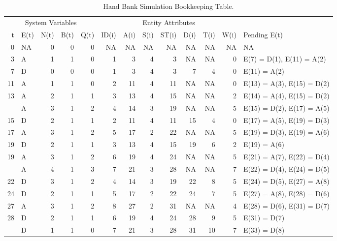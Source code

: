 \documentclass[
]{book}
\theoremstyle{definition}
\theoremstyle{definition}
\theoremstyle{definition}
\theoremstyle{definition}
\theoremstyle{remark}
\begin{document}
\begin{table}

\caption{\label{tab:SQBHFull}Hand Bank Simulation Bookkeeping Table.}
\centering
\fontsize{10}{12}\selectfont
\begin{tabular}[t]{rlrrrrrrrrrrl}
\toprule
\multicolumn{5}{c}{System Variables} & \multicolumn{7}{c}{Entity Attributes} & \multicolumn{1}{c}{ } \\
\cmidrule(l{3pt}r{3pt}){1-5} \cmidrule(l{3pt}r{3pt}){6-12}
t & E(t) & N(t) & B(t) & Q(t) & ID(i) & A(i) & S(i) & ST(i) & D(i) & T(i) & W(i) & Pending E(t)\\
\midrule
0 & NA & 0 & 0 & 0 & NA & NA & NA & NA & NA & NA & NA & NA\\
3 & A & 1 & 1 & 0 & 1 & 3 & 4 & 3 & NA & NA & 0 & E(7) = D(1), E(11) = A(2)\\
7 & D & 0 & 0 & 0 & 1 & 3 & 4 & 3 & 7 & 4 & 0 & E(11) = A(2)\\
11 & A & 1 & 1 & 0 & 2 & 11 & 4 & 11 & NA & NA & 0 & E(13) = A(3), E(15) = D(2)\\
13 & A & 2 & 1 & 1 & 3 & 13 & 4 & 15 & NA & NA & 2 & E(14) = A(4), E(15) = D(2)\\
\addlinespace
14 & A & 3 & 1 & 2 & 4 & 14 & 3 & 19 & NA & NA & 5 & E(15) = D(2), E(17) = A(5)\\
15 & D & 2 & 1 & 1 & 2 & 11 & 4 & 11 & 15 & 4 & 0 & E(17) = A(5), E(19) = D(3)\\
17 & A & 3 & 1 & 2 & 5 & 17 & 2 & 22 & NA & NA & 5 & E(19) = D(3), E(19) = A(6)\\
19 & D & 2 & 1 & 1 & 3 & 13 & 4 & 15 & 19 & 6 & 2 & E(19) = A(6)\\
19 & A & 3 & 1 & 2 & 6 & 19 & 4 & 24 & NA & NA & 5 & E(21) = A(7), E(22) = D(4)\\
\addlinespace
21 & A & 4 & 1 & 3 & 7 & 21 & 3 & 28 & NA & NA & 7 & E(22) = D(4), E(24) = D(5)\\
22 & D & 3 & 1 & 2 & 4 & 14 & 3 & 19 & 22 & 8 & 5 & E(24) = D(5), E(27) = A(8)\\
24 & D & 2 & 1 & 1 & 5 & 17 & 2 & 22 & 24 & 7 & 5 & E(27) = A(8), E(28) = D(6)\\
27 & A & 3 & 1 & 2 & 8 & 27 & 2 & 31 & NA & NA & 4 & E(28) = D(6), E(31) = D(7)\\
28 & D & 2 & 1 & 1 & 6 & 19 & 4 & 24 & 28 & 9 & 5 & E(31) = D(7)\\
\addlinespace
31 & D & 1 & 1 & 0 & 7 & 21 & 3 & 28 & 31 & 10 & 7 & E(33) = D(8)\\
\bottomrule
\end{tabular}
\end{table}
\end{document}
